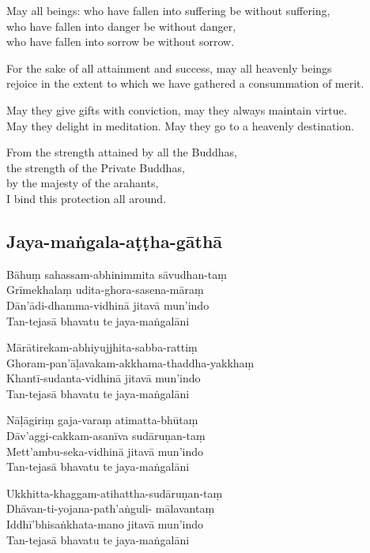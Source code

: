 \begin{paritta}

May all beings: who have fallen into suffering be without suffering,\\
who have fallen into danger be without danger,\\
who have fallen into sorrow be without sorrow.

For the sake of all attainment and success, may all heavenly beings\\
rejoice in the extent to which we have gathered a consummation of merit.

May they give gifts with conviction, may they always maintain virtue.\\
May they delight in meditation. May they go to a heavenly destination.

From the strength attained by all the Buddhas,\\
the strength of the Private Buddhas,\\
by the majesty of the arahants,\\
I bind this protection all around.

\subsection{Jaya-maṅgala-aṭṭha-gāthā}
\label{bahum}


\begin{paritta}
Bāhuṃ sahassam-abhinimmita sāvudhan-taṃ\\
Grīmekhalaṃ udita-ghora-sasena-māraṃ\\
Dān'ādi-dhamma-vidhinā jitavā mun'indo\\
Tan-tejasā bhavatu te jaya-maṅgalāni

Mārātirekam-abhiyujjhita-sabba-rattiṃ\\
Ghoram-pan'āḷavakam-akkhama-thaddha-yakkhaṃ\\
Khantī-sudanta-vidhinā jitavā mun'indo\\
Tan-tejasā bhavatu te jaya-maṅgalāni

Nāḷāgiriṃ gaja-varaṃ atimatta-bhūtaṃ\\
Dāv'aggi-cakkam-asanīva sudāruṇan-taṃ\\
Mett'ambu-seka-vidhinā jitavā mun'indo\\
Tan-tejasā bhavatu te jaya-maṅgalāni

Ukkhitta-khaggam-atihattha-sudāruṇan-taṃ\\
Dhāvan-ti-yojana-path'aṅguli- mālavantaṃ\\
Iddhī'bhisaṅkhata-mano jitavā mun'indo\\
Tan-tejasā bhavatu te jaya-maṅgalāni


\end{paritta}
\end{paritta}
